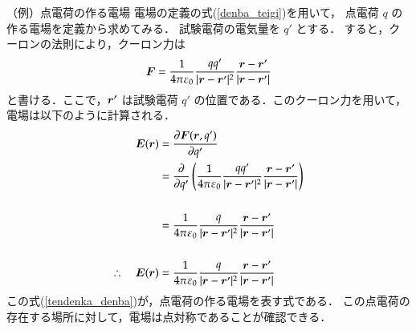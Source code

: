                 \begin{memo}{（例）点電荷の作る電場}
                    電場の定義の式(\ref{denba_teigi})を用いて，
                    点電荷 $q$ の作る電場を定義から求めてみる．
                    試験電荷の電気量を $q'$ とする．
                    すると，クーロンの法則により，クーロン力は
                            \begin{align}
                                \boldsymbol{F}=\frac{1}{4\pi\varepsilon_{0}}
                                \frac{qq'}{|\boldsymbol{r}-\boldsymbol{r}'|^{2}}
                                \frac{\boldsymbol{r}-\boldsymbol{r}'}
                                     {|\boldsymbol{r}-\boldsymbol{r}'|}
                            \end{align}
                    と書ける．ここで，$\boldsymbol{r}'$ は試験電荷 $q'$ の位置である．このクーロン力を用いて，
                    電場は以下のように計算される．
                        \begin{align}\label{tendenka_denba}
                            \bE(\br)
                            &= \frac{\rd\bF(\br,q')}{\rd q'} \notag \\
                            &= \frac{\rd}{\rd q'}\left(\frac{1}{4\pi\varepsilon_{0}}
                                \frac{qq'}{|\br-\br'|^{2}}
                                \frac{\br-\br'}
                                     {|\br-\br'|}\right)\notag \\ \notag \\
                            &= \frac{1}{4\pi\varepsilon_{0}}
                                \frac{q}{|\br-\br'|^{2}}
                                \frac{\br-\br'}
                                     {|\br-\br'|}\notag \\ \notag \\
                            \therefore \quad
                            \bE(\br)
                            &= \frac{1}{4\pi\varepsilon_{0}}
                                \frac{q}{|\br-\br'|^{2}}
                                \frac{\br-\br'}
                                     {|\br-\br'|}
                        \end{align}
                    この式(\ref{tendenka_denba})が，点電荷の作る電場を表す式である．
                    この点電荷の存在する場所に対して，電場は点対称であることが確認できる．
                \end{memo}


